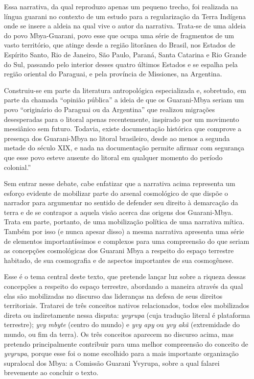 Essa narrativa, da qual reproduzo apenas um pequeno trecho, foi
realizada na língua guarani no contexto de um estudo para a
regularização da Terra Indígena onde se insere a aldeia na qual vive o
autor da narrativa. Trata-se de uma aldeia do povo Mbya-Guarani, povo
esse que ocupa uma série de fragmentos de um vasto território, que
atinge desde a região litorânea do Brasil, nos Estados de Espírito
Santo, Rio de Janeiro, São Paulo, Paraná, Santa Catarina e Rio Grande do
Sul, passando pelo interior desses quatro últimos Estados e se espalha
pela região oriental do Paraguai, e pela província de Missiones, na
Argentina.

Construiu-se em parte da literatura antropológica especializada e,
sobretudo, em parte da chamada ``opinião pública'' a ideia de que os
Guarani-Mbya seriam um povo ``originário do Paraguai ou da Argentina''
que realizou migrações desesperadas para o litoral apenas recentemente,
inspirado por um movimento messiânico sem futuro. Todavia, existe
documentação histórica que comprove a presença dos Guarani-Mbya no
litoral brasileiro, desde ao menos a segunda metade do século XIX, e
nada na documentação permite afirmar com segurança que esse povo esteve
ausente do litoral em qualquer momento do período colonial.''

Sem entrar nesse debate, cabe enfatizar que a narrativa acima representa
um esforço evidente de mobilizar parte do arsenal cosmológico de que
dispõe o narrador para argumentar no sentido de defender seu direito à
demarcação da terra e de se contrapor a aquela visão acerca das origens
dos Guarani-Mbya. Trata em parte, portanto, de uma mobilização política
de uma narrativa mítica. Também por isso (e nunca apesar disso) a mesma
narrativa apresenta uma série de elementos importantíssimos e complexos
para uma compreensão do que seriam as concepções cosmológicas dos
Guarani Mbya a respeito do espaço terrestre habitado, de sua cosmografia
e de aspectos importantes de sua cosmogênese.

Esse é o tema central deste texto, que pretende lançar luz sobre a
riqueza dessas concepções a respeito do espaço terrestre, abordando a
maneira através da qual elas são mobilizadas no discurso das lideranças
na defesa de seus direitos territoriais. Tratarei de três conceitos
nativos relacionados, todos eles mobilizados direta ou indiretamente
nessa disputa: \emph{yvyrupa} (cuja tradução literal é plataforma
terrestre); \emph{yvy mbyte} (centro do mundo) e \emph{yvy apy} ou
\emph{yvy akã} (extremidade do mundo, ou fim da terra). Os três
conceitos aparecem no discurso acima, mas pretendo principalmente
contribuir para uma melhor compreensão do conceito de \emph{yvyrupa},
porque esse foi o nome escolhido para a mais importante organização
supralocal dos Mbya: a Comissão Guarani Yvyrupa, sobre a qual falarei
brevemente ao concluir o texto.

